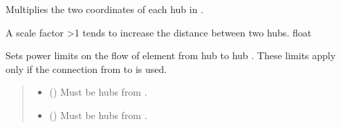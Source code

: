 \documentclass[letterpaper,10pt,english]{sphinxmanual}
\begin{document}
\begin{fulllineitems}
\begin{fulllineitems}
\end{fulllineitems}


\begin{fulllineitems}
\label{\detokenize{generated/tamos.network.ThermalNetwork:tamos.network.ThermalNetwork.scale_factor}}
\pysigstartsignatures
{}
\pysigstopsignatures
\sphinxAtStartPar
Multiplies the two coordinates of each hub in .

\sphinxAtStartPar
A scale factor \textgreater{}1 tends to increase the distance between two hubs.
float

\end{fulllineitems}


\begin{fulllineitems}
\label{\detokenize{generated/tamos.network.ThermalNetwork:tamos.network.ThermalNetwork.set_connection_power_bounds}}
\pysigstartsignatures
{}
\pysigstopsignatures
\sphinxAtStartPar
Sets power limits on the flow of element from hub  to hub .
These limits apply only if the connection from  to  is used.
\begin{quote}\begin{description}
\begin{itemize}
\item {} 
\sphinxAtStartPar
{} ({\hyperref[\detokenize{generated/tamos.Hub:tamos.Hub}]{}}) \textendash{} Must be hubs from .

\item {} 
\sphinxAtStartPar
{} ({\hyperref[\detokenize{generated/tamos.Hub:tamos.Hub}]{}}) \textendash{} Must be hubs from .


\end{itemize}
\end{description}
\end{quote}
\end{fulllineitems}
\end{fulllineitems}
\end{document}
